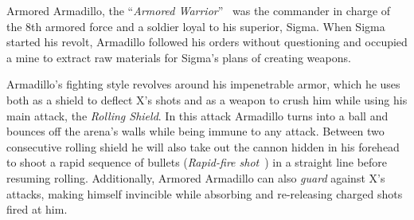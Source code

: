 Armored Armadillo, the ``\textit{Armored Warrior}''~\cite{book:MMX_Complete_art} was the commander in charge of the 8th armored force and a soldier loyal to his superior, Sigma. When Sigma started his revolt, Armadillo followed his orders without questioning and occupied a mine to extract raw materials for Sigma's plans of creating weapons.

Armadillo's fighting style revolves around his impenetrable armor, which he uses both as a shield to deflect X's shots and as a weapon to crush him while using his main attack, the \emph{Rolling Shield}. In this attack Armadillo turns into a ball and bounces off the arena's walls while being immune to any attack. Between two consecutive rolling shield he will also take out the cannon hidden in his forehead to shoot a rapid sequence of bullets (\emph{Rapid-fire shot}~\cite{book:Compendium}) in a straight line before resuming rolling. Additionally, Armored Armadillo can also \emph{guard} against X's attacks, making himself invincible while absorbing and re-releasing charged shots fired at him.
